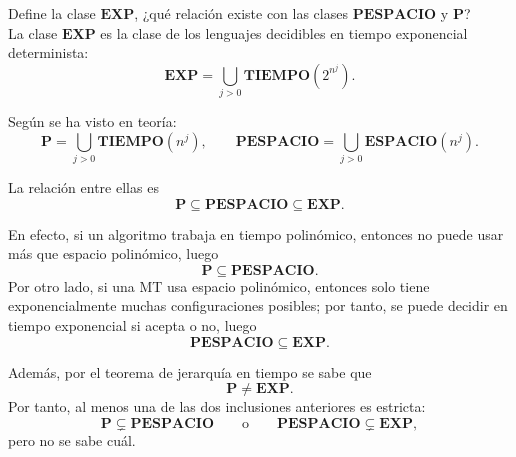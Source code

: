 \documentclass[12pt]{article}
\begin{document}
    \begin{ejercicio}[1.3 puntos]
        Define la clase $\textbf{EXP}$, ¿qué relación existe con las clases $\textbf{PESPACIO}$ y $\textbf{P}$? \\

        La clase $\textbf{EXP}$ es la clase de los lenguajes decidibles en tiempo
        exponencial determinista:
        $$
        \textbf{EXP}=\bigcup_{j>0}\textbf{TIEMPO}(2^{n^j}).
        $$

        Según se ha visto en teoría:
        $$
        \textbf{P}=\bigcup_{j>0}\textbf{TIEMPO}(n^j),
        \qquad
        \textbf{PESPACIO}=\bigcup_{j>0}\textbf{ESPACIO}(n^j).
        $$

        La relación entre ellas es
        $$
        \textbf{P}\subseteq \textbf{PESPACIO}\subseteq \textbf{EXP}.
        $$

        En efecto, si un algoritmo trabaja en tiempo polinómico, entonces no puede usar
        más que espacio polinómico, luego
        $$
        \textbf{P}\subseteq \textbf{PESPACIO}.
        $$
        Por otro lado, si una MT usa espacio polinómico, entonces solo tiene
        exponencialmente muchas configuraciones posibles; por tanto, se puede decidir en
        tiempo exponencial si acepta o no, luego
        $$
        \textbf{PESPACIO}\subseteq \textbf{EXP}.
        $$

        Además, por el teorema de jerarquía en tiempo se sabe que
        $$
        \textbf{P}\neq \textbf{EXP}.
        $$
        Por tanto, al menos una de las dos inclusiones anteriores es estricta:
        $$
        \textbf{P}\subsetneq \textbf{PESPACIO}
        \qquad\text{o}\qquad
        \textbf{PESPACIO}\subsetneq \textbf{EXP},
        $$
        pero no se sabe cuál.
    \end{ejercicio}

    \newpage
\end{document}
